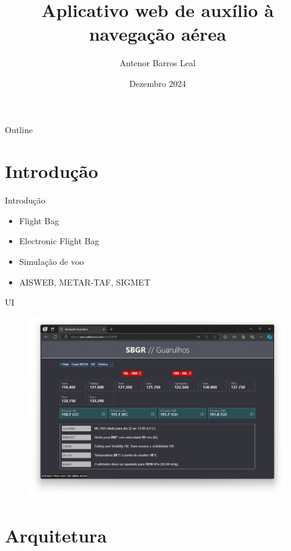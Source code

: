 \documentclass{beamer}
\title{Aplicativo web de auxílio à navegação aérea}
\author{Antenor Barros Leal}
\institute{Departamento de Informática \\ PUC-Rio}
\date{Dezembro 2024}
\begin{document}
\begin{frame}
    \titlepage
\end{frame}

\begin{frame}{Outline}
    \tableofcontents
\end{frame}

\section{Introdução}

\begin{frame}{Introdução}
    \begin{itemize}
        \item Flight Bag
        \item Electronic Flight Bag
        \item Simulação de voo
        \item AISWEB, METAR-TAF, SIGMET
    \end{itemize}
\end{frame}

\begin{frame}{UI}
    \begin{figure}[ht]
        \begin{center}
        \includegraphics[width=0.8\linewidth]{img/UI.png}
        \label{fig:UI}
        \end{center}
    \end{figure}
\end{frame}


\section{Arquitetura}
\end{document}
